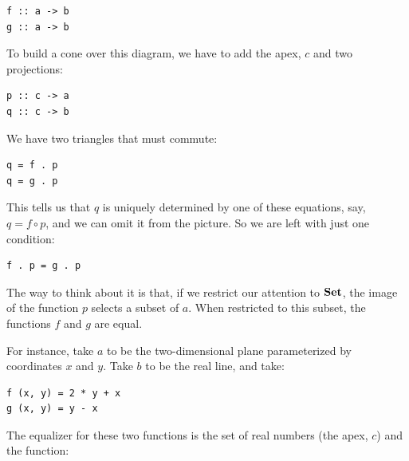 \begin{Verbatim}
f :: a -> b 
g :: a -> b
\end{Verbatim}

To build a cone over this diagram, we have to add the apex, $c$
and two projections:

\begin{Verbatim}
p :: c -> a 
q :: c -> b
\end{Verbatim}

\begin{figure}[H]
\centering
{}
\end{figure}

\noindent
We have two triangles that must commute:

\begin{Verbatim}
q = f . p 
q = g . p
\end{Verbatim}

This tells us that $q$ is uniquely determined by one of these
equations, say, $q = f \circ p$, and we can omit it from the
picture. So we are left with just one condition:

\begin{Verbatim}
f . p = g . p
\end{Verbatim}

The way to think about it is that, if we restrict our attention to
$\mathbf{Set}$, the image of the function $p$ selects a subset of
$a$. When restricted to this subset, the functions $f$ and
$g$ are equal.

For instance, take $a$ to be the two-dimensional plane
parameterized by coordinates $x$ and $y$. Take $b$
to be the real line, and take:

\begin{Verbatim}
f (x, y) = 2 * y + x 
g (x, y) = y - x
\end{Verbatim}

The equalizer for these two functions is the set of real numbers (the
apex, $c$) and the function:

